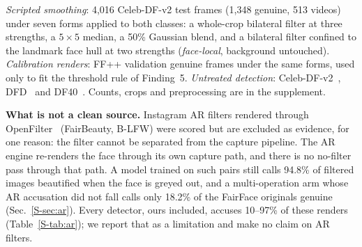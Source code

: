 \documentclass[journal]{IEEEtran}  %
\begin{document}
\emph{Scripted smoothing}: 4,016 Celeb-DF-v2 test frames (1,348 genuine, 513 videos)
under seven forms applied to both classes: a whole-crop bilateral filter at three strengths, a $5\times5$ median, a 50\%
Gaussian blend, and a bilateral filter confined to the landmark face hull at two strengths (\emph{face-local}, background
untouched). \emph{Calibration renders}: FF++ validation genuine frames under the same forms, used only to fit the threshold
rule of Finding~5. \emph{Untreated detection}: Celeb-DF-v2~\cite{celebdf}, DFD~\cite{dfd} and DF40~\cite{df40}. Counts,
crops and preprocessing are in the supplement.

\textbf{What is not a clean source.} Instagram AR filters rendered through OpenFilter~\cite{openfilter2022} (FairBeauty, B-LFW) were scored but are excluded as evidence, for one reason: the filter cannot be separated from the capture pipeline. The AR engine re-renders the face through its own capture path, and there
is no no-filter pass through that path. A model trained on such pairs still calls 94.8\% of filtered images beautified when the face is greyed out,
and a multi-operation arm whose AR accusation did not fall calls only 18.2\% of the FairFace originals genuine (Sec.~\ref{S-sec:ar}).
Every detector, ours included, accuses 10--97\% of these renders (Table~\ref{S-tab:ar}); we report that as a limitation and
make no claim on AR filters.
\end{document}
